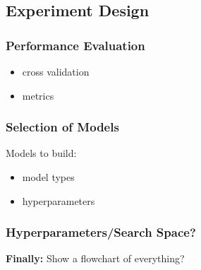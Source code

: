 \subsection{Experiment Design}


\subsubsection{Performance Evaluation}
\begin{itemize}[noitemsep]
	\item cross validation
	\item metrics
\end{itemize}





\subsubsection{Selection of Models}


Models to build:





\begin{itemize}[noitemsep]
	\item model types
	\item hyperparameters
\end{itemize}

\subsubsection{Hyperparameters/Search Space?}


\textbf{Finally:} Show a flowchart of everything?







